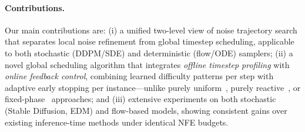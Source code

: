 \paragraph{Contributions.}
Our main contributions are:
(i) a unified two-level view of noise trajectory search that separates local
noise refinement from global timestep scheduling, applicable to both
stochastic (DDPM/SDE) and deterministic (flow/ODE) samplers;
(ii) a novel global scheduling algorithm that integrates \emph{offline timestep
profiling} with \emph{online feedback control}, combining learned difficulty
patterns per step with adaptive early stopping per instance---unlike
purely uniform~\citep{ramesh2025nts}, purely
reactive~\citep{kim2025rbf}, or fixed-phase~\citep{zhang2025tscend}
approaches;
and (iii) extensive experiments on both stochastic (Stable Diffusion, EDM)
and flow-based models, showing consistent gains over existing
inference-time methods under identical NFE budgets.
